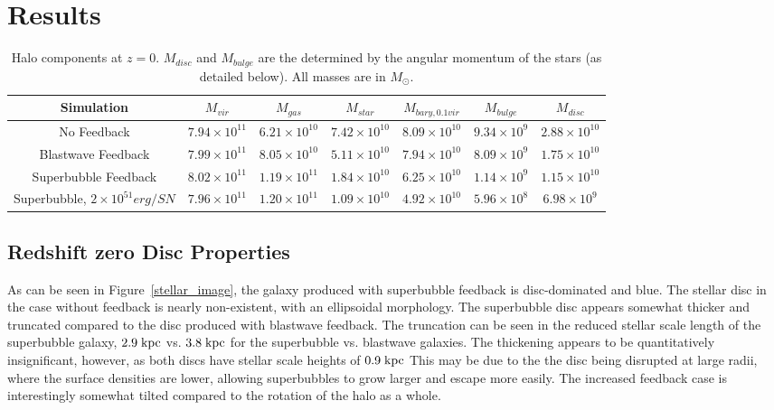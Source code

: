 \section{Results}
\begin{table}
    \begin{tabular}{ c c c c c c c}
        \hline
        Simulation & $M_{vir}$ & $M_{gas}$ &
        $M_{star}$  &$M_{bary,0.1vir}$ & $M_{bulge}$ & $M_{disc}$ \\
        \hline
        No Feedback & $7.94\times10^{11}$ & $6.21\times10^{10}$ &
        $7.42\times10^{10}$ & $8.09\times10^{10}$ & $9.34\times10^{9}$ &
        $2.88\times10^{10}$\\
        Blastwave Feedback & $7.99\times10^{11}$ & $8.05\times10^{10}$ &
        $5.11\times10^{10}$ & $7.94\times10^{10}$ & $8.09\times10^{9}$ &
        $1.75\times10^{10}$ \\
        Superbubble Feedback & $8.02\times10^{11}$ & $1.19\times10^{11}$ &
        $1.84\times10^{10}$ & $6.25\times10^{10}$ & $1.14\times10^{9}$ &
        $1.15\times10^{10}$ \\
        Superbubble, $2\times10^{51} erg/SN$ & $7.96\times10^{11}$ &
        $1.20\times10^{11}$ & $1.09\times10^{10}$ &  $4.92\times10^{10}$ & 
        $5.96\times10^{8}$ & $6.98\times10^9$\\
    \end{tabular}
    \caption[Halo Components at $z=0$ for different feedback models]{Halo
    components at $z=0$. $M_{disc}$ and $M_{bulge}$ are the determined by the
    angular momentum of the stars (as detailed below).  All masses are in
    $M_\odot$.}
    \label{properties}
\end{table}


\subsection{Redshift zero Disc Properties}
As can be seen in Figure~\ref{stellar_image}, the galaxy produced with
superbubble feedback is disc-dominated and blue.  The stellar disc in the case
without feedback is nearly non-existent, with an ellipsoidal morphology.  The
superbubble disc appears somewhat thicker and truncated compared to the disc
produced with blastwave feedback.  The truncation can be seen in the reduced
stellar scale length of the superbubble galaxy, $2.9\;\rm{kpc}$ vs.
$3.8\;\rm{kpc}$ for the superbubble vs. blastwave galaxies.  The thickening
appears to be quantitatively insignificant, however, as both discs have stellar
scale heights of $0.9\;\rm{kpc}$ This may be due to the the disc being disrupted
at large radii, where the surface densities are lower, allowing superbubbles to
grow larger and escape more easily.  The increased feedback case is
interestingly somewhat tilted compared to the rotation of the halo as a whole.  

